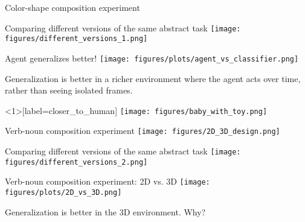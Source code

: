 \documentclass{beamer}
\begin{document}
\begin{frame}{Color-shape composition experiment}
\centering
{}
\end{frame}

\begin{frame}{Comparing different versions of the same abstract task}
\centering
\texttt{[image: figures/different\_versions\_1.png]}
\end{frame}

\begin{frame}{Agent generalizes better!}
\vspace{1em}
\centering
\texttt{[image: figures/plots/agent\_vs\_classifier.png]}
\end{frame}

\begin{frame}[standout]
Generalization is better in a richer environment where the agent acts over time, rather than seeing isolated frames.
\end{frame}

\begin{frame}<1>[label=closer_to_human]
\centering
\texttt{[image: figures/baby\_with\_toy.png]}
\end{frame}

\begin{frame}{Verb-noun composition experiment}
\centering
\texttt{[image: figures/2D\_3D\_design.png]}
\end{frame}

\begin{frame}{Comparing different versions of the same abstract task}
\centering
\texttt{[image: figures/different\_versions\_2.png]}
\end{frame}

\begin{frame}{Verb-noun composition experiment: 2D vs. 3D}
\vspace{1em}
\centering
\texttt{[image: figures/plots/2D\_vs\_3D.png]}
\end{frame}

\begin{frame}[standout]
Generalization is better in the 3D environment. Why?
\end{frame}
\end{document}
